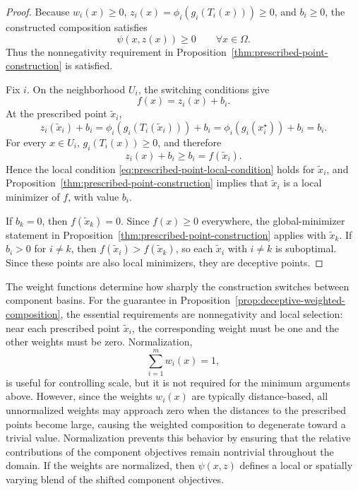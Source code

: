 \documentclass[journal]{IEEEtran}
\theoremstyle{remark}
\theoremstyle{plain}
\begin{document}
\begin{proof}
	Because \(w_i(x)\ge0\), \(z_i(x)=\phi_i(g_i(T_i(x)))\ge0\), and \(b_i\ge0\),
	the constructed composition satisfies
	\[
	\psi(x,z(x))\ge0
	\qquad
	\forall x\in\Omega.
	\]
	Thus the nonnegativity requirement in
	Proposition~\ref{thm:prescribed-point-construction} is satisfied.
	
	Fix \(i\). On the neighborhood \(U_i\), the switching conditions give
	\[
	f(x)=z_i(x)+b_i.
	\]
	At the prescribed point \(\tilde x_i\),
	\[
	z_i(\tilde x_i)+b_i
	=
	\phi_i(g_i(T_i(\tilde x_i)))+b_i
	=
	\phi_i(g_i(x_i^\star))+b_i
	=
	b_i.
	\]
	For every \(x\in U_i\), \(g_i(T_i(x))\ge0\), and therefore
	\[
	z_i(x)+b_i\ge b_i=f(\tilde x_i).
	\]
	Hence the local condition
	\eqref{eq:prescribed-point-local-condition} holds for \(\tilde x_i\), and
	Proposition~\ref{thm:prescribed-point-construction} implies that
	\(\tilde x_i\) is a local minimizer of \(f\), with value \(b_i\).
	
	If \(b_k=0\), then \(f(\tilde x_k)=0\). Since \(f(x)\ge0\) everywhere,
	the global-minimizer statement in
	Proposition~\ref{thm:prescribed-point-construction} applies with
	\(\tilde x_k\). If \(b_i>0\) for \(i\ne k\), then
	\(f(\tilde x_i)>f(\tilde x_k)\), so each \(\tilde x_i\) with \(i\ne k\) is
	suboptimal. Since these points are also local minimizers, they are deceptive
	points. 
\end{proof}

The weight functions determine how sharply the construction switches between
component basins. For the guarantee in
Proposition~\ref{prop:deceptive-weighted-composition}, the essential
requirements are nonnegativity and local selection: near each prescribed point
\(\tilde x_i\), the corresponding weight must be one and the other weights
must be zero. Normalization,
\[
	\sum_{i=1}^m w_i(x)=1,
\]
is useful for controlling scale, but it is not required for the minimum
arguments above. However, since the weights $w_i(x)$ are typically distance-based, all unnormalized weights may approach zero when the distances to the prescribed points become large, causing the weighted composition to degenerate toward a trivial value. Normalization prevents this behavior by ensuring that the relative contributions of the component objectives remain nontrivial throughout the domain. If the weights are normalized, then \(\psi(x,z)\) defines a local or spatially varying blend of the shifted component objectives. 
\end{document}
